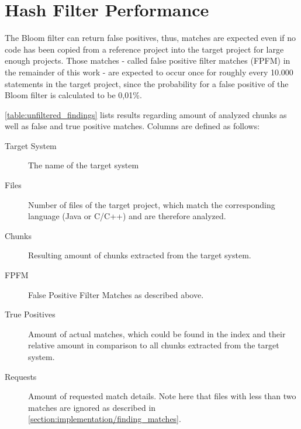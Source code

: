 \section{Hash Filter Performance}\label{section:evaluation/hash_filter_performance}
The Bloom filter can return false positives, thus, matches are expected even if no code has been copied from a reference project into the target project for large enough projects.
Those matches - called false positive filter matches (FPFM) in the remainder of this work - are expected to occur once for roughly every 10.000 statements in the target project, since the probability for a false positive of the Bloom filter is calculated to be 0,01\%. 

\autoref{table:unfiltered_findings} lists results regarding amount of analyzed chunks as well as false and true positive matches.
Columns are defined as follows:
\begin{description}
	\item[Target System] The name of the target system
	\item[Files] Number of files of the target project, which match the corresponding language (Java or C/C++) and are therefore analyzed.
	\item[Chunks] Resulting amount of chunks extracted from the target system.
	\item[FPFM] False Positive Filter Matches as described above.
	\item[True Positives] Amount of actual matches, which could be found in the index and their relative amount in comparison to all chunks extracted from the target system.
	\item[Requests] Amount of requested match details. Note here that files with less than two matches are ignored as described in \autoref{section:implementation/finding_matches}.
\end{description}

